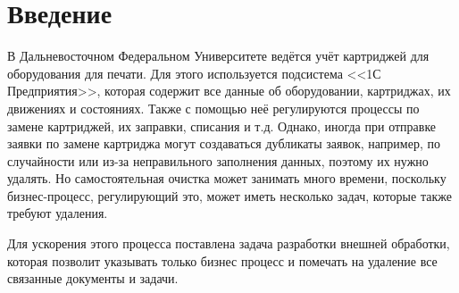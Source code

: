 \section{Введение}
    В Дальневосточном Федеральном Университете ведётся учёт картриджей для оборудования для печати. Для этого используется подсистема <<1С Предприятия>>, которая содержит все данные об оборудовании, картриджах, их движениях и состояниях. Также с помощью неё регулируются процессы по замене картриджей, их заправки, списания и т.д. Однако, иногда при отправке заявки по замене картриджа могут создаваться дубликаты заявок, например, по случайности или из-за неправильного заполнения данных, поэтому их нужно удалять. Но самостоятельная очистка может занимать много времени, поскольку бизнес-процесс, регулирующий это, может иметь несколько задач, которые также требуют удаления.

    Для ускорения этого процесса поставлена задача разработки внешней обработки, которая позволит указывать только бизнес процесс и помечать на удаление все связанные документы и задачи.
